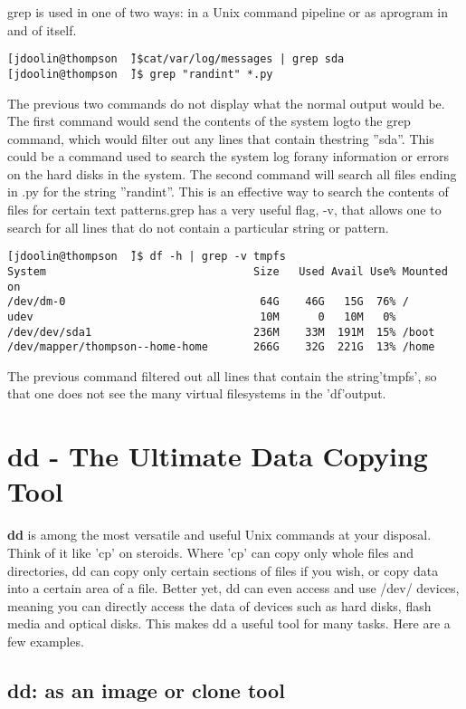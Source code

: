 grep is used in one of two ways: in a Unix command pipeline or as aprogram in and of itself.

\begin{verbatim}
[jdoolin@thompson  ̃]$cat/var/log/messages | grep sda
[jdoolin@thompson  ̃]$ grep "randint" *.py
\end{verbatim}

The previous two commands do not display what the normal output would be. The first command would send the contents of the system logto the grep command, which would filter out any lines that contain thestring ”sda”. This could be a command used to search the system log forany information or errors on the hard disks in the system.  The second command will search all files ending in .py for the string ”randint”. This is an effective way to search the contents of files for certain text patterns.grep has a very useful flag, -v, that allows one to search for all lines that do not contain a particular string or pattern.

\begin{verbatim}[jdoolin@thompson  ̃]$ df -h | grep -v tmpfs
System                                Size   Used Avail Use% Mounted on
/dev/dm-0                              64G    46G   15G  76% /
udev                                   10M      0   10M   0% 
/dev/dev/sda1                         236M    33M  191M  15% /boot
/dev/mapper/thompson--home-home       266G    32G  221G  13% /home
\end{verbatim}

The previous command filtered out all lines that contain the string’tmpfs’, so that one does not see the many virtual filesystems in the ’df’output.

\section{dd - The Ultimate Data Copying Tool}

\textbf{dd} is among the most versatile and useful Unix commands at your disposal. Think of it like ’cp’ on steroids. Where ’cp’ can copy only whole files and directories, dd can copy only certain sections of files if you wish, or copy data into a certain area of a file. Better yet, dd can even access and use /dev/ devices, meaning you can directly access the data of devices such as hard disks, flash media and optical disks. This makes dd a useful tool for many tasks. Here are a few examples.

\subsection{dd: as an image or clone tool}

